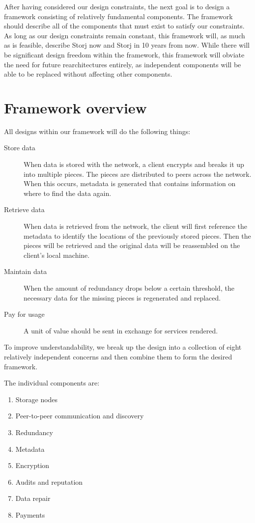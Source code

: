 \documentclass[11pt,fleqn,openany]{book}
\begin{document}
After having considered our design constraints, the next goal is to design
a framework consisting of relatively fundamental components.
The framework should describe
all of the components that must exist to satisfy our constraints.
As long as our design constraints remain constant, this framework will, as
much as is feasible, describe Storj now and Storj in 10 years from now.
While there will be significant design freedom within the framework,
this framework will obviate the need for future rearchitectures entirely, as
independent components will be able to be replaced without affecting other
components.

\section{Framework overview}

All designs within our framework will do the following things:

\begin{description}

\item[Store data] When data is stored with the network, a client encrypts
and breaks it up into multiple pieces. The pieces are distributed
to peers across the network. When this occurs, metadata is generated that
contains information on where to find the data again.

\item[Retrieve data] When data is retrieved from the network,
the client will first reference the metadata to identify the locations of the
previously stored pieces.
Then the pieces will be retrieved and the original data will be reassembled
on the client's local machine.

\item[Maintain data] When the amount of redundancy drops below a certain
threshold, the necessary data for the missing pieces is regenerated and
replaced.

\item[Pay for usage] A unit of value should be sent in exchange for
services rendered.

\end{description}

To improve understandability, we break up the design into a collection of eight
relatively independent concerns and then combine them to form the desired
framework.

The individual components are:

\begin{enumerate}
\item Storage nodes
\item Peer-to-peer communication and discovery
\item Redundancy
\item Metadata
\item Encryption
\item Audits and reputation
\item Data repair
\item Payments
\end{enumerate}
\end{document}
